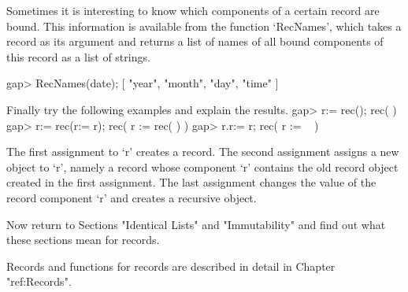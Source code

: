 Sometimes it is interesting to know which  components of a certain record
are  bound.  This information is available  from the function `RecNames',
which  takes a record as  its  argument and  returns  a list of names of
all bound components of this record as a list of strings.

\beginexample
    gap> RecNames(date);
    [ "year", "month", "day", "time" ]
\endexample

\exercise Finally try the following examples and explain the results.
\beginexample
    gap> r:= rec();
    rec(
       )
    gap> r:= rec(r:= r);
    rec(
      r := rec(
           ) )
    gap> r.r:= r;
    rec(
      r := ~ )
\endexample

\answer  The  first  assignment to `r'    creates a  record.   The second
assignment assigns a  new object to `r', namely  a record whose component
`r' contains the old record object created  in the first assignment.  The
last assignment changes the value of the record component `r' and creates
a recursive object.


Now return to Sections "Identical Lists"  and "Immutability" and find out
what these sections mean for records.

Records and functions  for records are  described in  detail  in  Chapter
"ref:Records".

